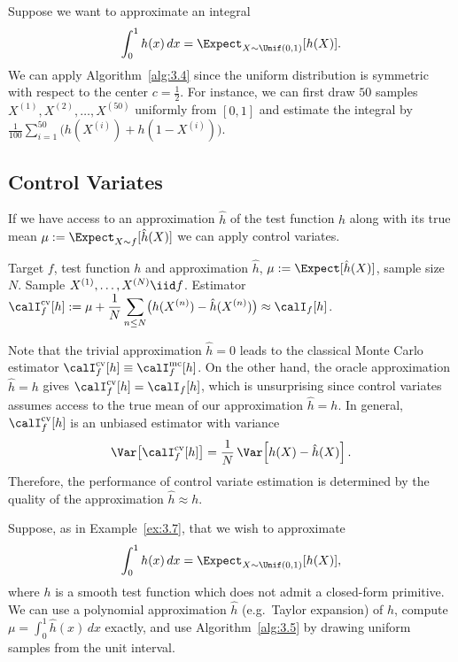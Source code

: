 \begin{example}
\label{ex:3.7}
Suppose we want to approximate an integral
\[
  \int_0^1 h(x)\,dx = \Expect_{X \sim \Unif(0,1)}[h(X)].
\]
We can apply Algorithm~\ref{alg:3.4} since the uniform distribution is symmetric
with respect to the center $c = \tfrac{1}{2}$. For instance, we can first draw
$50$ samples $X^{(1)}, X^{(2)}, \ldots, X^{(50)}$ uniformly from $[0,1]$ and
estimate the integral by
$\tfrac{1}{100}\sum_{i=1}^{50}\bigl(h(X^{(i)}) + h(1-X^{(i)})\bigr)$.
\end{example}

\subsection{Control Variates}
\label{sec:3.3.2}

If we have access to an approximation $\hat{h}$ of the test function $h$ along
with its true mean $\mu := \Expect_{X \sim f}[\hat{h}(X)]$ we can apply control
variates.

\begin{algorithm}[H]
\caption{Control Variates}
\label{alg:3.5}
\begin{algorithmic}[1]
\Require Target $f$, test function $h$ and approximation $\hat{h}$,
         $\mu := \Expect[\hat{h}(X)]$, sample size $N$.
\State Sample $X^{(1)}, \ldots, X^{(N)} \iid f$.
\Ensure Estimator
  $\calI_f^{\mathrm{cv}}[h]
   := \mu + \dfrac{1}{N}\displaystyle\sum_{n \leq N}
      \bigl(h(X^{(n)}) - \hat{h}(X^{(n)})\bigr)
   \approx \calI_f[h]$.
\end{algorithmic}
\end{algorithm}

Note that the trivial approximation $\hat{h} = 0$ leads to the classical Monte
Carlo estimator $\calI_f^{\mathrm{cv}}[h] \equiv \calI_f^{\mathrm{mc}}[h]$. On
the other hand, the oracle approximation $\hat{h} = h$ gives
$\calI_f^{\mathrm{cv}}[h] = \calI_f[h]$, which is unsurprising since control
variates assumes access to the true mean of our approximation $\hat{h} = h$. In
general, $\calI_f^{\mathrm{cv}}[h]$ is an unbiased estimator with variance
\[
  \Var\!\left[\calI_f^{\mathrm{cv}}[h]\right]
  = \frac{1}{N}\,\Var\!\left[h(X) - \hat{h}(X)\right].
\]
Therefore, the performance of control variate estimation is determined by the
quality of the approximation $\hat{h} \approx h$.

\begin{example}
\label{ex:3.8}
Suppose, as in Example~\ref{ex:3.7}, that we wish to approximate
\[
  \int_0^1 h(x)\,dx = \Expect_{X \sim \Unif(0,1)}[h(X)],
\]
where $h$ is a smooth test function which does not admit a closed-form
primitive. We can use a polynomial approximation $\hat{h}$ (e.g.\ Taylor
expansion) of $h$, compute $\mu = \int_0^1 \hat{h}(x)\,dx$ exactly, and use
Algorithm~\ref{alg:3.5} by drawing uniform samples from the unit interval.
\end{example}
